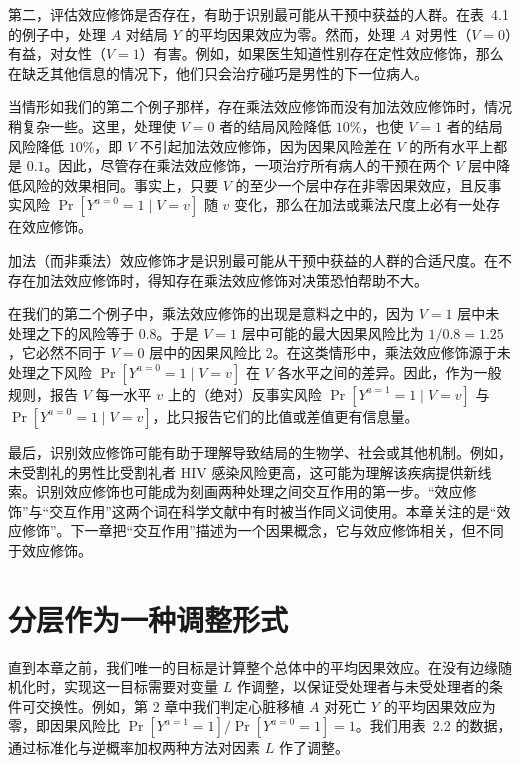 第二，评估效应修饰是否存在，有助于识别最可能从干预中获益的人群。在表~4.1 的例子中，处理 $A$ 对结局 $Y$ 的平均因果效应为零。然而，处理 $A$ 对男性（$V=0$）有益，对女性（$V=1$）有害。例如，如果医生知道性别存在定性效应修饰，那么在缺乏其他信息的情况下，他们只会治疗碰巧是男性的下一位病人。

当情形如我们的第二个例子那样，存在乘法效应修饰而没有加法效应修饰时，情况稍复杂一些。这里，处理使 $V=0$ 者的结局风险降低 $10\%$，也使 $V=1$ 者的结局风险降低 $10\%$，即 $V$ 不引起加法效应修饰，因为因果风险差在 $V$ 的所有水平上都是 $0.1$。因此，尽管存在乘法效应修饰，一项治疗所有病人的干预在两个 $V$ 层中降低风险的效果相同。事实上，只要 $V$ 的至少一个层中存在非零因果效应，且反事实风险 $\Pr[Y^{a=0}=1\mid V=v]$ 随 $v$ 变化，那么在加法或乘法尺度上必有一处存在效应修饰。

加法（而非乘法）效应修饰才是识别最可能从干预中获益的人群的合适尺度。在不存在加法效应修饰时，得知存在乘法效应修饰对决策恐怕帮助不大。

在我们的第二个例子中，乘法效应修饰的出现是意料之中的，因为 $V=1$ 层中未处理之下的风险等于 $0.8$。于是 $V=1$ 层中可能的最大因果风险比为 $1/0.8=1.25$，它必然不同于 $V=0$ 层中的因果风险比 2。在这类情形中，乘法效应修饰源于未处理之下风险 $\Pr[Y^{a=0}=1\mid V=v]$ 在 $V$ 各水平之间的差异。因此，作为一般规则，报告 $V$ 每一水平 $v$ 上的（绝对）反事实风险 $\Pr[Y^{a=1}=1\mid V=v]$ 与 $\Pr[Y^{a=0}=1\mid V=v]$，比只报告它们的比值或差值更有信息量。

最后，识别效应修饰可能有助于理解导致结局的生物学、社会或其他机制。例如，未受割礼的男性比受割礼者 HIV 感染风险更高，这可能为理解该疾病提供新线索。识别效应修饰也可能成为刻画两种处理之间交互作用的第一步。“效应修饰”与“交互作用”这两个词在科学文献中有时被当作同义词使用。本章关注的是“效应修饰”。下一章把“交互作用”描述为一个因果概念，它与效应修饰相关，但不同于效应修饰。

\section{分层作为一种调整形式}

直到本章之前，我们唯一的目标是计算整个总体中的平均因果效应。在没有边缘随机化时，实现这一目标需要对变量 $L$ 作调整，以保证受处理者与未受处理者的条件可交换性。例如，第 2 章中我们判定心脏移植 $A$ 对死亡 $Y$ 的平均因果效应为零，即因果风险比 $\Pr[Y^{a=1}=1]/\Pr[Y^{a=0}=1]=1$。我们用表~2.2 的数据，通过标准化与逆概率加权两种方法对因素 $L$ 作了调整。

